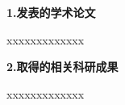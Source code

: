 \begin{achievement}
{%
	\noindent \heiti {} \textbf{1.发表的学术论文} 
	
	\noindent xxxxxxxxxxxxx
	
	\noindent \heiti \textbf{2.取得的相关科研成果}
	
	\noindent xxxxxxxxxxxxx
}
\end{achievement}